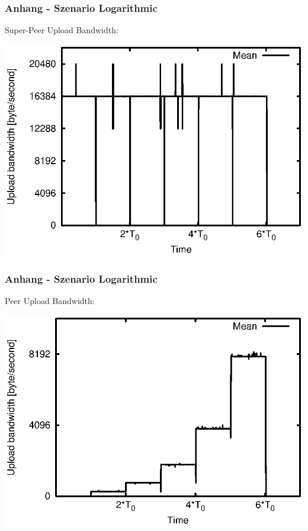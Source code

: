\begin{frame}
  \frametitle{Anhang - Szenario Logarithmic}
  Super-Peer Upload Bandwidth:
  
  \begin{center}
    \includegraphics[width=1\textwidth]{fig/plots/scenario_3_log/plots/GeneratedMeanCurrentSuperSeederUploadBandwidth.csv.eps}
  \end{center}
\end{frame}


\begin{frame}
  \frametitle{Anhang - Szenario Logarithmic}
  Peer Upload Bandwidth:
  
  \begin{center}
    \includegraphics[width=1\textwidth]{fig/plots/scenario_3_log/plots/GeneratedMeanCurrentUploadBandwidth.csv.eps}
  \end{center}
\end{frame}


